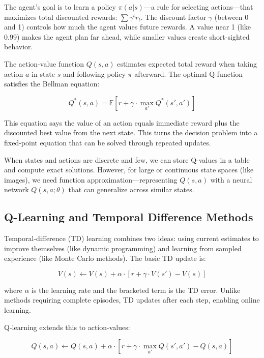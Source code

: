 The agent's goal is to learn a policy $\pi(a|s)$---a rule for selecting actions---that maximizes total discounted rewards: $\sum \gamma^t r_t$. The discount factor $\gamma$ (between 0 and 1) controls how much the agent values future rewards. A value near 1 (like 0.99) makes the agent plan far ahead, while smaller values create short-sighted behavior.

The action-value function $Q(s,a)$ estimates expected total reward when taking action $a$ in state $s$ and following policy $\pi$ afterward. The optimal Q-function satisfies the Bellman equation:

\begin{equation}
Q^*(s, a) = \mathbb{E}[r + \gamma \cdot \max_{a'} Q^*(s', a')]
\end{equation}

This equation says the value of an action equals immediate reward plus the discounted best value from the next state. This turns the decision problem into a fixed-point equation that can be solved through repeated updates.

When states and actions are discrete and few, we can store Q-values in a table and compute exact solutions. However, for large or continuous state spaces (like images), we need function approximation---representing $Q(s,a)$ with a neural network $Q(s,a;\theta)$ that can generalize across similar states.


\subsection{Q-Learning and Temporal Difference Methods}

Temporal-difference (TD) learning combines two ideas: using current estimates to improve themselves (like dynamic programming) and learning from sampled experience (like Monte Carlo methods). The basic TD update is:

\begin{equation}
V(s) \leftarrow V(s) + \alpha \cdot [r + \gamma \cdot V(s') - V(s)]
\end{equation}

\noindent where $\alpha$ is the learning rate and the bracketed term is the TD error. Unlike methods requiring complete episodes, TD updates after each step, enabling online learning.

Q-learning extends this to action-values:

\begin{equation}
Q(s, a) \leftarrow Q(s, a) + \alpha \cdot [r + \gamma \cdot \max_{a'} Q(s', a') - Q(s, a)]
\end{equation}

